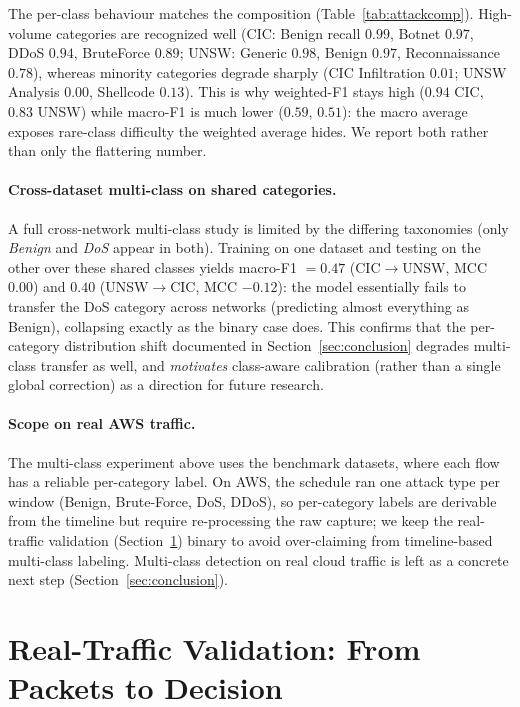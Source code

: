\documentclass[preprint,12pt,authoryear]{elsarticle}
\begin{document}
The per-class behaviour matches the composition (Table~\ref{tab:attackcomp}).
High-volume categories are recognized well (CIC: Benign recall $0.99$, Botnet
$0.97$, DDoS $0.94$, BruteForce $0.89$; UNSW: Generic $0.98$, Benign $0.97$,
Reconnaissance $0.78$), whereas minority categories degrade sharply (CIC
Infiltration $0.01$; UNSW Analysis $0.00$, Shellcode $0.13$). This is why weighted-F1
stays high ($0.94$ CIC, $0.83$ UNSW) while macro-F1 is much lower ($0.59$, $0.51$):
the macro average exposes rare-class difficulty the weighted average hides. We
report both rather than only the flattering number.

\paragraph{Cross-dataset multi-class on shared categories.} A full cross-network
multi-class study is limited by the differing taxonomies (only \emph{Benign} and
\emph{DoS} appear in both). Training on one dataset and testing on the other over
these shared classes yields macro-F1 $=0.47$ (CIC$\rightarrow$UNSW, MCC $0.00$) and
$0.40$ (UNSW$\rightarrow$CIC, MCC $-0.12$): the model essentially fails to transfer
the DoS category across networks (predicting almost everything as Benign),
collapsing exactly as the binary case does. This confirms that the per-category
distribution shift documented in Section~\ref{sec:conclusion} degrades multi-class
transfer as well, and \emph{motivates} class-aware calibration (rather than a single
global correction) as a direction for future research.

\paragraph{Scope on real AWS traffic.} The multi-class experiment above uses the
benchmark datasets, where each flow has a reliable per-category label. On AWS, the
schedule ran one attack type per window (Benign, Brute-Force, DoS, DDoS), so
per-category labels are derivable from the timeline but require re-processing the raw
capture; we keep the real-traffic validation (Section~\ref{sec:realtraffic}) binary
to avoid over-claiming from timeline-based multi-class labeling. Multi-class
detection on real cloud traffic is left as a concrete next step
(Section~\ref{sec:conclusion}).

\section{Real-Traffic Validation: From Packets to Decision}
\label{sec:realtraffic}
\end{document}
